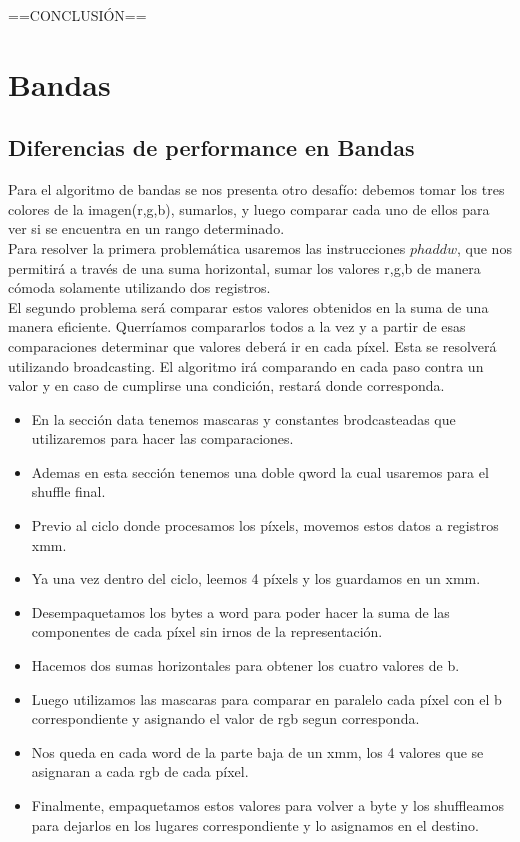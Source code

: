 \documentclass[a4paper]{article}
\begin{document}
==CONCLUSIÓN==

\newpage
\section{Bandas}
\subsection{Diferencias de performance en Bandas}
Para el algoritmo de bandas se nos presenta otro desafío: debemos tomar los tres colores de la imagen(r,g,b), sumarlos, y luego comparar cada uno de ellos para ver si se encuentra en un rango determinado.
\\
Para resolver la primera problemática usaremos las instrucciones $phaddw$, que nos permitirá a través de una suma horizontal, sumar los valores r,g,b de manera cómoda solamente utilizando dos registros.
\\
El segundo problema será comparar estos valores obtenidos en la suma de una manera eficiente. Querríamos compararlos todos a la vez y a partir de esas comparaciones determinar que valores deberá ir en cada píxel. Esta se resolverá utilizando broadcasting. El algoritmo irá comparando en cada paso contra un valor y en caso de cumplirse una condición, restará donde corresponda.


\begin{itemize}
\item  En la sección data tenemos mascaras y constantes brodcasteadas que utilizaremos para hacer las comparaciones.
\item  Ademas en esta sección tenemos una doble qword la cual usaremos para el shuffle final.
\item  Previo al ciclo donde procesamos los píxels, movemos estos datos a registros xmm.
\item  Ya una vez dentro del ciclo, leemos 4 píxels y los guardamos en un xmm.
\item  Desempaquetamos los bytes a word para poder hacer la suma de las componentes de cada píxel sin irnos de la representación.
\item  Hacemos dos sumas horizontales para obtener los cuatro valores  de b.
\item  Luego utilizamos las mascaras para comparar en paralelo cada píxel con el b correspondiente y asignando el valor de rgb segun corresponda.
\item  Nos queda en cada word de la parte baja de un xmm, los 4 valores que se asignaran a cada rgb de cada píxel.
\item  Finalmente, empaquetamos estos valores para volver a byte y los shuffleamos para dejarlos en los lugares correspondiente y lo asignamos en el destino.
\end{itemize}
\end{document}
